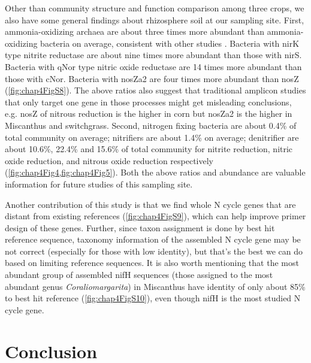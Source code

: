 \documentclass[]{msu-thesis}
\begin{document}
Other than community structure and function comparison among three crops, we also have some general findings about rhizosphere soil at our sampling site. First, ammonia-oxidizing archaea are about three times more abundant than ammonia-oxidizing bacteria on average, consistent with other studies \cite{leininger_archaea_2006,prosser_archaeal_2012,gubry-rangin_archaea_2010}. Bacteria with nirK type nitrite reductase are about nine times more abundant than those with nirS. Bacteria with qNor type nitric oxide reductase are 14 times more abundant than those with cNor. Bacteria with nosZa2 are four times more abundant than nosZ (\cref{fig:chap4FigS8}). The above ratios also suggest that traditional amplicon studies that only target one gene in those processes might get misleading conclusions, e.g. nosZ of nitrous reduction is the higher in corn but nosZa2 is the higher in Miscanthus and switchgrass. Second, nitrogen fixing bacteria are about 0.4\% of total community on average; nitrifiers are about 1.4\% on average; denitrifier are about 10.6\%, 22.4\% and 15.6\% of total community for nitrite reduction, nitric oxide reduction, and nitrous oxide reduction respectively (\cref{fig:chap4Fig4,fig:chap4Fig5}). Both the above ratios and abundance are valuable information for future studies of this sampling site.

Another contribution of this study is that we find whole N cycle genes that are distant from existing references (\cref{fig:chap4FigS9}), which can help improve primer design of these genes. Further, since taxon assignment is done by best hit reference sequence, taxonomy information of the assembled N cycle gene may be not correct (especially for those with low identity), but that’s the best we can do based on limiting reference sequences. It is also worth mentioning that the most abundant group of assembled nifH sequences (those assigned to the most abundant genus \textit{Coraliomargarita}) in Miscanthus have identity of only about 85\% to best hit reference (\cref{fig:chap4FigS10}), even though nifH is the most studied N cycle gene.

\section{Conclusion}
\end{document}
